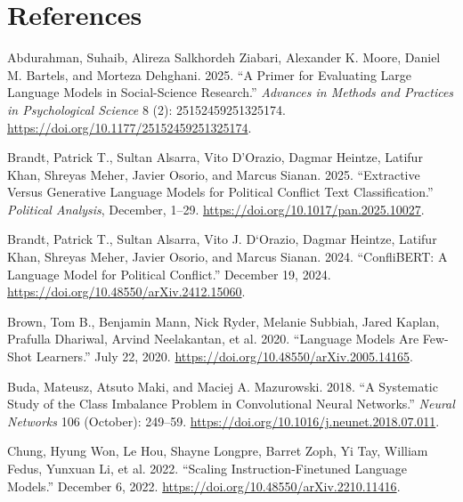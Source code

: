 \documentclass[
  11pt,
]{article}
\newlength{\cslhangindent}
\newenvironment{CSLReferences}[2] %
 {\begin{list}{}{%
  \setlength{\itemindent}{0pt}
  \setlength{\leftmargin}{0pt}
  \setlength{\parsep}{0pt}
  \ifodd #1
   \setlength{\leftmargin}{\cslhangindent}
   \setlength{\itemindent}{-1\cslhangindent}
  \fi
  \setlength{\itemsep}{#2\baselineskip}}}
 {\end{list}}
\begin{document}
\newpage

\section{References}\label{references}

\setlength{\parindent}{-0.2in}
\setlength{\leftskip}{0.2in}
\setlength{\parskip}{8pt}
\noindent

\label{refs}
\begin{CSLReferences}{1}{0}
Abdurahman, Suhaib, Alireza Salkhordeh Ziabari, Alexander K. Moore,
Daniel M. Bartels, and Morteza Dehghani. 2025. {``A {Primer} for
{Evaluating Large Language Models} in {Social-Science Research}.''}
\emph{Advances in Methods and Practices in Psychological Science} 8 (2):
25152459251325174. \url{https://doi.org/10.1177/25152459251325174}.

Brandt, Patrick T., Sultan Alsarra, Vito D'Orazio, Dagmar Heintze,
Latifur Khan, Shreyas Meher, Javier Osorio, and Marcus Sianan. 2025.
{``Extractive Versus {Generative Language Models} for {Political
Conflict Text Classification}.''} \emph{Political Analysis}, December,
1--29. \url{https://doi.org/10.1017/pan.2025.10027}.

Brandt, Patrick T., Sultan Alsarra, Vito J. D`Orazio, Dagmar Heintze,
Latifur Khan, Shreyas Meher, Javier Osorio, and Marcus Sianan. 2024.
{``{ConfliBERT}: {A Language Model} for {Political Conflict}.''}
December 19, 2024. \url{https://doi.org/10.48550/arXiv.2412.15060}.

Brown, Tom B., Benjamin Mann, Nick Ryder, Melanie Subbiah, Jared Kaplan,
Prafulla Dhariwal, Arvind Neelakantan, et al. 2020. {``Language {Models}
Are {Few-Shot Learners}.''} July 22, 2020.
\url{https://doi.org/10.48550/arXiv.2005.14165}.

Buda, Mateusz, Atsuto Maki, and Maciej A. Mazurowski. 2018. {``A
Systematic Study of the Class Imbalance Problem in Convolutional Neural
Networks.''} \emph{Neural Networks} 106 (October): 249--59.
\url{https://doi.org/10.1016/j.neunet.2018.07.011}.

Chung, Hyung Won, Le Hou, Shayne Longpre, Barret Zoph, Yi Tay, William
Fedus, Yunxuan Li, et al. 2022. {``Scaling {Instruction-Finetuned
Language Models}.''} December 6, 2022.
\url{https://doi.org/10.48550/arXiv.2210.11416}.


\end{CSLReferences}
\end{document}
